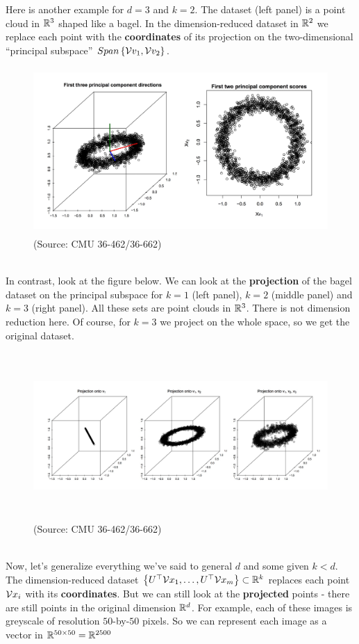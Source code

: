 Here is another example for $d=3$ and $k=2$. The dataset (left panel) 
is a point cloud in
$\mathbb{R}^3$ shaped like a bagel. In the dimension-reduced dataset in $\mathbb{R}^2$ we
replace each point with the {\bf coordinates} of its projection on the
two-dimensional ``principal subspace'' $Span\left\{ \mathcal{V}{v}_1,\mathcal{V}{v}_2 \right\}$.
\begin{figure}[H]
  \centering
  \includegraphics[height=2.5in]{pca_tib_1.jpeg}    
  \caption{(Source: CMU 36-462/36-662)}
\end{figure}
~\\
In contrast, look at the figure below. We can look at the {\bf projection} of the bagel dataset on the
principal subspace for $k=1$ (left panel), $k=2$ (middle panel) 
and $k=3$ (right panel). All these sets are point clouds in $\mathbb{R}^3$. There is not
dimension reduction here. Of course,
for $k=3$ we project on the whole space, so we get the original dataset.
\begin{figure}[H]
  \centering
  \includegraphics[height=2.5in]{pca_tib_2.jpeg}    
  \caption{(Source: CMU 36-462/36-662)}
\end{figure}
~\\
Now, let's generalize everything we've said to general $d$
and some given $k<d$. The dimension-reduced dataset 
$\left\{ U^\top \mathcal{V}{x}_1,\ldots,U^\top \mathcal{V}{x}_m \right\}\subset\mathbb{R}^k$ replaces each
point $\mathcal{V}{x}_i$ with its {\bf coordinates}. 
But we can still look at the {\bf projected} points - there are still points in
the original dimension $\mathbb{R}^d$. For example, each of these images is greyscale of
resolution $50$-by-$50$ pixels. So we can represent each image as a vector in
$\mathbb{R}^{50\times 50}=\mathbb{R}^{2500}$


